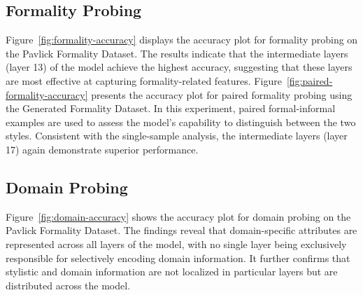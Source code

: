 \documentclass[twocolumn]{article}
\begin{document}
\subsection{Formality Probing}

Figure~\ref{fig:formality-accuracy} displays the accuracy plot for formality probing on the Pavlick Formality Dataset. The results indicate that the intermediate layers (layer 13) of the model achieve the highest accuracy, suggesting that these layers are most effective at capturing formality-related features.
Figure~\ref{fig:paired-formality-accuracy} presents the accuracy plot for paired formality probing using the Generated Formality Dataset. In this experiment, paired formal-informal examples are used to assess the model’s capability to distinguish between the two styles. Consistent with the single-sample analysis, the intermediate layers (layer 17) again demonstrate superior performance.
\subsection{Domain Probing}
Figure~\ref{fig:domain-accuracy} shows the accuracy plot for domain probing on the Pavlick Formality Dataset. The findings reveal that domain-specific attributes are represented across all layers of the model, with no single layer being exclusively responsible for selectively encoding domain information. It further confirms that stylistic and domain information are not localized in particular layers but are distributed across the model.
\end{document}
